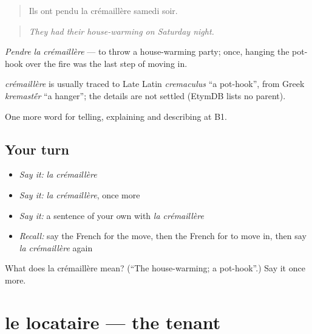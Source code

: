 \begin{quote}
Ils ont pendu la crémaillère samedi soir.
\end{quote}

\begin{quote}
\emph{They had their house-warming on Saturday night.}
\end{quote}

\emph{Pendre la crémaillère} — to throw a house-warming party; once, hanging the pot-hook over the fire was the last step of moving in.

\begin{cousinweb}
\emph{crémaillère} is usually traced to Late Latin \emph{cremaculus} \textquotedblleft{}a pot-hook\textquotedblright{}, from Greek \emph{kremast\'{\={e}}r} \textquotedblleft{}a hanger\textquotedblright{}; the details are not settled (EtymDB lists no parent).
\end{cousinweb}

\begin{grammarlens}[title={What you've built}]
One more word for telling, explaining and describing at B1.
\end{grammarlens}

\subsection*{Your turn}
\begin{itemize}
\raggedright
  \item \emph{Say it:} \emph{la crémaillère}
  \item \emph{Say it:} \emph{la crémaillère}, once more
  \item \emph{Say it:} a sentence of your own with \emph{la crémaillère}
  \item \emph{Recall:} say the French for the move, then the French for to move in, then say \emph{la crémaillère} again
\end{itemize}

\begin{tcolorbox}[breakable,colback=teal!4,colframe=teal!35!black,title={Before you move on}]
What does la crémaillère mean? (\textquotedblleft{}The house-warming; a pot-hook\textquotedblright{}.) Say it once more.
\end{tcolorbox}
\section[le locataire]{le locataire — the tenant}

\label{lesson:FR-C312-locataire}



